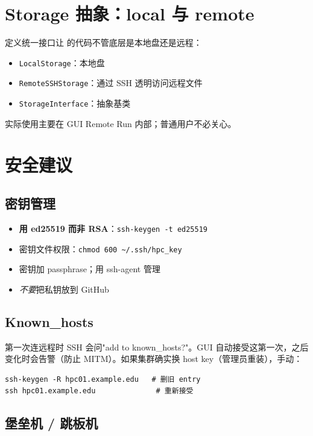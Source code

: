 \section{Storage 抽象：local 与 remote}

 定义统一接口让 \openbench{} 的代码不管底层是本地盘还是远程：

\begin{itemize}
  \item \texttt{LocalStorage}：本地盘
  \item \texttt{RemoteSSHStorage}：通过 SSH 透明访问远程文件
  \item \texttt{StorageInterface}：抽象基类
\end{itemize}

实际使用主要在 GUI Remote Run 内部；普通用户不必关心。

\section{安全建议}

\subsection{密钥管理}

\begin{itemize}
  \item \textbf{用 ed25519 而非 RSA}：\texttt{ssh-keygen -t ed25519}
  \item 密钥文件权限：\texttt{chmod 600 \~{}/.ssh/hpc\_key}
  \item 密钥加 passphrase；用 ssh-agent 管理
  \item \emph{不要}把私钥放到 GitHub
\end{itemize}

\subsection{Known\_hosts}

第一次连远程时 SSH 会问"add to known\_hosts?"。GUI 自动接受这第一次，之后变化时会告警（防止 MITM）。如果集群确实换 host key（管理员重装），手动：

\begin{verbatim}
ssh-keygen -R hpc01.example.edu   # 删旧 entry
ssh hpc01.example.edu              # 重新接受
\end{verbatim}

\subsection{堡垒机 / 跳板机}

